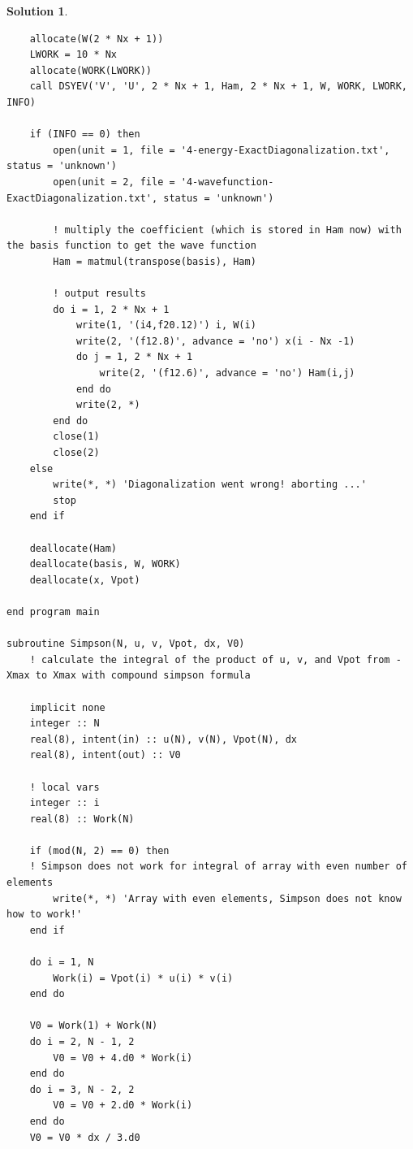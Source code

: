 \documentclass[UTF8,10pt,a4paper]{article}
\theoremstyle{Problem}
\theoremstyle{Solution}
\newtheorem*{sol}{Solution}
\begin{document}
\begin{sol}
\begin{lstlisting}
    allocate(W(2 * Nx + 1))
    LWORK = 10 * Nx
    allocate(WORK(LWORK))
    call DSYEV('V', 'U', 2 * Nx + 1, Ham, 2 * Nx + 1, W, WORK, LWORK, INFO)

    if (INFO == 0) then
        open(unit = 1, file = '4-energy-ExactDiagonalization.txt', status = 'unknown')
        open(unit = 2, file = '4-wavefunction-ExactDiagonalization.txt', status = 'unknown')

        ! multiply the coefficient (which is stored in Ham now) with the basis function to get the wave function
        Ham = matmul(transpose(basis), Ham)

        ! output results
        do i = 1, 2 * Nx + 1
            write(1, '(i4,f20.12)') i, W(i)
            write(2, '(f12.8)', advance = 'no') x(i - Nx -1)
            do j = 1, 2 * Nx + 1
                write(2, '(f12.6)', advance = 'no') Ham(i,j)
            end do
            write(2, *)
        end do
        close(1)
        close(2)
    else
        write(*, *) 'Diagonalization went wrong! aborting ...'
        stop
    end if

    deallocate(Ham)
    deallocate(basis, W, WORK)
    deallocate(x, Vpot)

end program main

subroutine Simpson(N, u, v, Vpot, dx, V0)
    ! calculate the integral of the product of u, v, and Vpot from -Xmax to Xmax with compound simpson formula

    implicit none
    integer :: N
    real(8), intent(in) :: u(N), v(N), Vpot(N), dx
    real(8), intent(out) :: V0

    ! local vars
    integer :: i
    real(8) :: Work(N)

    if (mod(N, 2) == 0) then
    ! Simpson does not work for integral of array with even number of elements
        write(*, *) 'Array with even elements, Simpson does not know how to work!'
    end if

    do i = 1, N
        Work(i) = Vpot(i) * u(i) * v(i)
    end do
     
    V0 = Work(1) + Work(N)
    do i = 2, N - 1, 2
        V0 = V0 + 4.d0 * Work(i)
    end do
    do i = 3, N - 2, 2
        V0 = V0 + 2.d0 * Work(i)
    end do
    V0 = V0 * dx / 3.d0


\end{lstlisting}
\end{sol}
\end{document}
